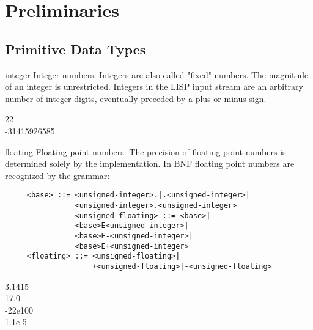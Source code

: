 



\section{Preliminaries}

\subsection{Primitive Data Types}
\begin{Type}{integer}
Integer numbers:
Integers are also called "fixed" numbers. The magnitude of
an integer is unrestricted. Integers in the LISP input stream are
an arbitrary number of integer digits, eventually preceded by
a plus or minus sign.
\begin{Examples}
22\\
-31415926585\\
\end{Examples}
\end{Type} 

\begin{Type}{floating}
Floating point numbers: The precision of floating point
numbers is determined solely by the implementation. In BNF floating
point numbers are recognized by the grammar:
\begin{verbatim}
     <base> ::= <unsigned-integer>.|.<unsigned-integer>|
                <unsigned-integer>.<unsigned-integer>
                <unsigned-floating> ::= <base>|
                <base>E<unsigned-integer>|
                <base>E-<unsigned-integer>|
                <base>E+<unsigned-integer>
     <floating> ::= <unsigned-floating>|
                    +<unsigned-floating>|-<unsigned-floating>
\end{verbatim}
\begin{Examples}
3.1415\\
17.0\\
-22e100\\
1.1e-5
\end{Examples}
\end{Type}

